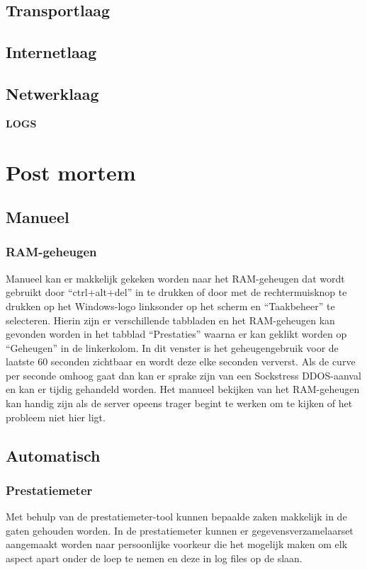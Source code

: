 \documentclass[pdftex,a4paper,12pt]{report}
\begin{document}
\section{Transportlaag}

\section{Internetlaag}

\section{Netwerklaag}



\textbf{LOGS}

\chapter{Post mortem}
\section{Manueel}
\subsection{RAM-geheugen}
Manueel kan er makkelijk gekeken worden naar het RAM-geheugen dat wordt gebruikt door "`ctrl+alt+del"' in te drukken of door met de rechtermuisknop te drukken op het Windows-logo linksonder op het scherm en "`Taakbeheer"' te selecteren. Hierin zijn er verschillende tabbladen en het RAM-geheugen kan gevonden worden in het tabblad "`Prestaties"' waarna er kan geklikt worden op "`Geheugen"' in de linkerkolom. In dit venster is het geheugengebruik voor de laatste 60 seconden zichtbaar en wordt deze elke seconden ververst. Als de curve per seconde omhoog gaat dan kan er sprake zijn van een Sockstress DDOS-aanval en kan er tijdig gehandeld worden. Het manueel bekijken van het RAM-geheugen kan handig zijn als de server opeens trager begint te werken om te kijken of het probleem niet hier ligt.

\section{Automatisch}
\subsection{Prestatiemeter}
Met behulp van de prestatiemeter-tool kunnen bepaalde zaken makkelijk in de gaten gehouden worden. In de prestatiemeter kunnen er gegevensverzamelaarset aangemaakt worden naar persoonlijke voorkeur die het mogelijk maken om elk aspect apart onder de loep te nemen en deze in log files op de slaan.
\end{document}
